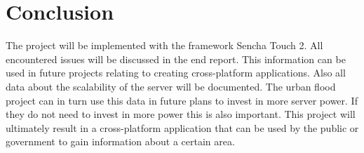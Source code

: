 \pagebreak

\section{Conclusion}
The project will be implemented with the framework Sencha Touch 2. All encountered issues will be discussed in the end report. This information can be used in future projects relating to creating cross-platform applications. Also all data about the scalability of the server will be documented. The urban flood project can in turn use this data in future plans to invest in more server power. If they do not need to invest in more power this is also important.
This project will ultimately result in a cross-platform application that can be used by the public or government to gain information about a certain area.


